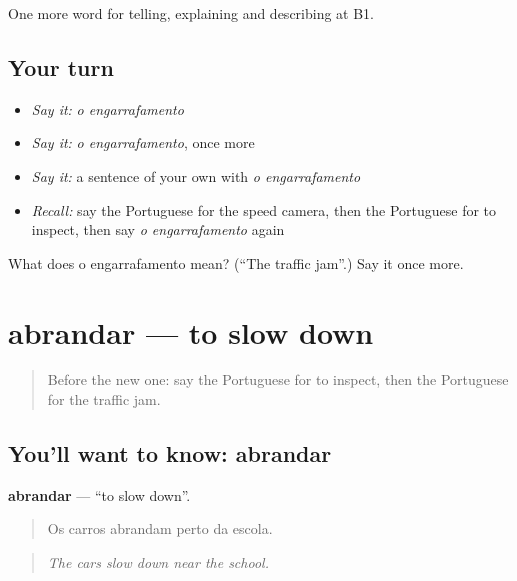 \begin{grammarlens}[title={What you've built}]
One more word for telling, explaining and describing at B1.
\end{grammarlens}

\subsection*{Your turn}
\begin{itemize}
\raggedright
  \item \emph{Say it:} \emph{o engarrafamento}
  \item \emph{Say it:} \emph{o engarrafamento}, once more
  \item \emph{Say it:} a sentence of your own with \emph{o engarrafamento}
  \item \emph{Recall:} say the Portuguese for the speed camera, then the Portuguese for to inspect, then say \emph{o engarrafamento} again
\end{itemize}

\begin{tcolorbox}[breakable,colback=teal!4,colframe=teal!35!black,title={Before you move on}]
What does o engarrafamento mean? (\textquotedblleft{}The traffic jam\textquotedblright{}.) Say it once more.
\end{tcolorbox}
\section[abrandar]{abrandar — to slow down}

\label{lesson:PT-C409-abrandar}



\begin{quote}
Before the new one: say the Portuguese for to inspect, then the Portuguese for the traffic jam.
\end{quote}

\subsection*{You'll want to know: abrandar}
\textbf{abrandar} — \textquotedblleft{}to slow down\textquotedblright{}.

\begin{quote}
Os carros abrandam perto da escola.
\end{quote}

\begin{quote}
\emph{The cars slow down near the school.}
\end{quote}

